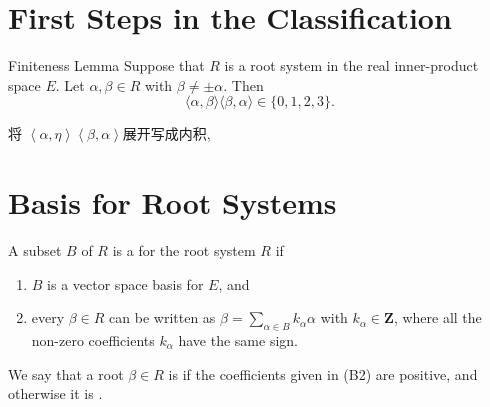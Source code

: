 \documentclass[../main.tex]{subfiles}
\begin{document}
\section{First Steps in the Classification}
\begin{lemma}{Finiteness Lemma}{}
Suppose that \(R\) is a root system in the real inner-product space \(E\). Let \(\alpha,\beta\in R\) with \(\beta\neq\pm\alpha\). Then
\[
\langle\alpha,\beta\rangle\langle\beta,\alpha\rangle\in\{0,1,2,3\}.
\]
\end{lemma}

\begin{proofsketch}
    将 \(  \left<\alpha ,\eta  \right>\left<\beta ,\alpha  \right>  \)展开写成内积, 
\end{proofsketch}
\section{Basis for Root Systems}

\begin{definition}{}{}
A subset \(B\) of \(R\) is a  for the root system \(R\) if
\begin{enumerate}
  \item[(B1)] \(B\) is a vector space basis for \(E\), and
  \item[(B2)] every \(\beta \in R\) can be written as \(\beta = \sum_{\alpha \in B} k_{\alpha}\alpha\) with \(k_{\alpha} \in \mathbf{Z}\), where all the non-zero coefficients \(k_{\alpha}\) have the same sign.
\end{enumerate}
\end{definition}
\begin{remark}
    We say that a root \(\beta \in R\) is  if the coefficients given in (B2) are positive, and otherwise it is .
\end{remark}
\end{document}
